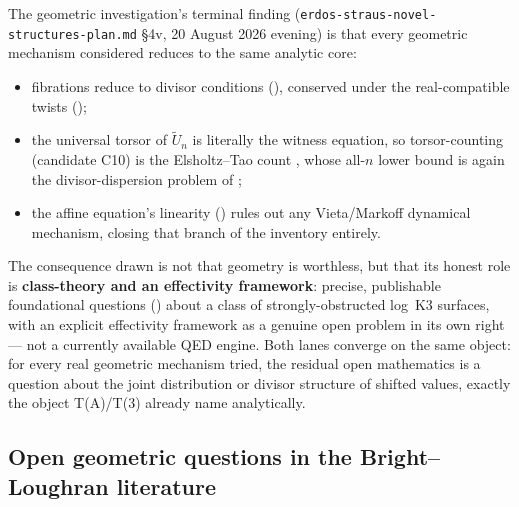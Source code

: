 \documentclass[11pt]{article}
\theoremstyle{plain}
\theoremstyle{definition}
\theoremstyle{remark}
\renewcommand{\_}{\textunderscore\allowbreak}
\begin{document}
The geometric investigation's terminal finding (\texttt{erdos-\allowbreak straus-\allowbreak novel-\allowbreak structures-\allowbreak plan.md}
\S4v, 20 August 2026 evening) is that every geometric mechanism considered reduces to the same
analytic core:
\begin{itemize}[leftmargin=1.4em]
  \item fibrations reduce to divisor conditions (), conserved under the
        real-compatible twists ();
  \item the universal torsor of $\widetilde U_n$ is literally the witness equation, so
        torsor-counting (candidate C10) is the Elsholtz--Tao count \cite{ElsholtzTao2013}, whose
        all-$n$ lower bound is again the divisor-dispersion problem of ;
  \item the affine equation's linearity () rules out any Vieta/Markoff
        dynamical mechanism, closing that branch of the inventory entirely.
\end{itemize}
The consequence drawn is not that geometry is worthless, but that its honest role is
\textbf{class-theory and an effectivity framework}: precise, publishable foundational questions
() about a class of strongly-obstructed log~K3 surfaces, with an
explicit effectivity framework as a genuine open problem in its own right — not a currently
available QED engine. Both lanes converge on the same object: for every real geometric mechanism
tried, the residual open mathematics is a question about the joint distribution or divisor
structure of shifted values, exactly the object T(A)/T(3) already name analytically.

\subsection{Open geometric questions in the Bright--Loughran literature}
\label{subsec:loughran-questions}
\end{document}
